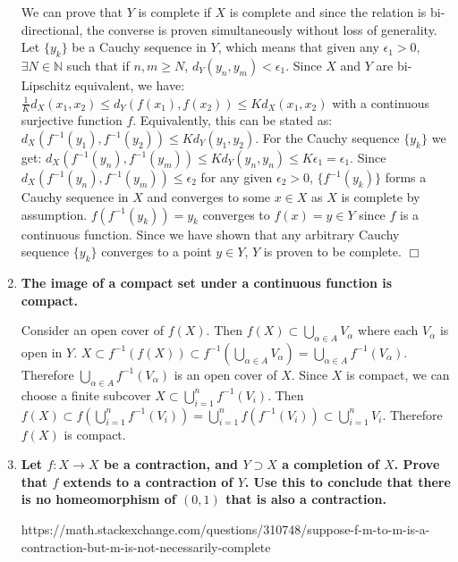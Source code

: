\documentclass[5pt,letterpaper,reqno]{amsart}
\newcommand{\N}{\mathbb N}
\begin{document}
\begin{enumerate}[1.]
\begin{flushleft}
    We can prove that $Y$ is complete if $X$ is complete and since the relation is bi-directional, the converse is proven simultaneously without loss of generality. Let $\{y_k\}$ be a Cauchy sequence in $Y$, which means that given any $\epsilon_1 > 0$, $\exists N \in \N$ such that if $n, m \geq N$, $d_Y(y_n, y_m) < \epsilon_1$. Since $X$ and $Y$ are bi-Lipschitz equivalent, we have: $\frac{1}{K}d_X(x_1, x_2) \leq d_Y(f(x_1), f(x_2)) \leq Kd_X(x_1, x_2)$ with a continuous surjective function $f$. Equivalently, this can be stated as: $d_X(f^{-1}(y_1), f^{-1}(y_2)) \leq Kd_Y(y_1, y_2)$. For the Cauchy sequence $\{y_k\}$ we get: $d_X(f^{-1}(y_n), f^{-1}(y_m)) \leq Kd_Y(y_n, y_n) \leq K\epsilon_1 = \epsilon_1$. Since $d_X(f^{-1}(y_n), f^{-1}(y_m)) \leq \epsilon_2$ for any given $\epsilon_2 > 0$, $\{f^{-1}(y_k)\}$ forms a Cauchy sequence in $X$ and converges to some $x \in X$ as $X$ is complete by assumption. $f(f^{-1}(y_k)) = y_k$ converges to $f(x) = y \in Y$ since $f$ is a continuous function. Since we have shown that any arbitrary Cauchy sequence $\{y_k\}$ converges to a point $y \in Y$, $Y$ is proven to be complete. $\Box$
\end{flushleft}
\item \textbf{The image of a compact set under a continuous function is compact.}
\begin{flushleft}
    Consider an open cover of $f(X)$. Then $f(X) \subset \bigcup_{\alpha\in A} V_\alpha$ where each $V_\alpha$ is open in $Y$. $X \subset f^{-1}(f(X)) \subset f^{-1}\left( \bigcup_{\alpha\in A} V_\alpha \right) = \bigcup_{\alpha\in A} f^{-1}(V_\alpha)$. Therefore $\bigcup_{\alpha\in A} f^{-1}(V_\alpha)$ is an open cover of $X$. Since $X$ is compact, we can choose a finite subcover $X \subset \bigcup_{i=1}^n f^{-1}(V_i)$. Then $f(X) \subset f\left(\bigcup_{i=1}^n f^{-1}(V_i)\right) = \bigcup_{i=1}^n f\left(f^{-1}(V_i)\right) \subset \bigcup_{i=1}^n V_i$. Therefore $f(X)$ is compact.
\end{flushleft}
\item \textbf{Let $f: X\rightarrow X$ be a contraction, and $Y\supset X$ a completion of $X$. Prove that $f$ extends to a contraction of $Y$. Use this to conclude that there is no homeomorphism of $(0,1)$ that is also a contraction.}
\begin{flushleft}
    https://math.stackexchange.com/questions/310748/suppose-f-m-to-m-is-a-contraction-but-m-is-not-necessarily-complete
\end{flushleft}
\vspace{1in}

\end{enumerate}
\end{document}
